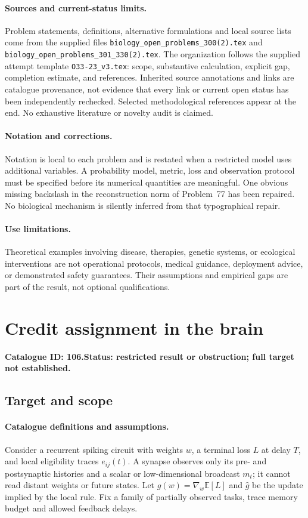 \documentclass[11pt]{article}
\newcommand{\E}{\mathbb E}
\providecommand{\E}{\mathbb E}
\begin{document}
\paragraph{Sources and current-status limits.}
Problem statements, definitions, alternative formulations and local source lists
come from the supplied files
\texttt{biology\_open\_problems\_300(2).tex} and
\texttt{biology\_open\_problems\_301\_330(2).tex}.
The organization follows the supplied attempt template
\texttt{O33-23\_v3.tex}: scope, substantive calculation, explicit gap,
completion estimate, and references. Inherited source annotations and links are
catalogue provenance, not evidence that every link or current open status has
been independently rechecked. Selected methodological references appear at the
end. No exhaustive literature or novelty audit is claimed.

\paragraph{Notation and corrections.}
Notation is local to each problem and is restated when a restricted model uses
additional variables. A probability model, metric, loss and observation protocol
must be specified before its numerical quantities are meaningful. One obvious
missing backslash in the reconstruction norm of Problem~77 has been repaired.
No biological mechanism is silently inferred from that typographical repair.

\paragraph{Use limitations.}
Theoretical examples involving disease, therapies, genetic systems, or ecological
interventions are not operational protocols, medical guidance, deployment advice,
or demonstrated safety guarantees. Their assumptions and empirical gaps are part
of the result, not optional qualifications.

\setcounter{section}{105}
\section{Credit assignment in the brain}
\label{prob:106}
\noindent\textbf{Catalogue ID: 106.}\quad \textbf{Status: restricted result or obstruction; full target not established.}
\subsection{Target and scope}
\paragraph{Catalogue definitions and assumptions.}
Consider a recurrent spiking circuit with weights $w$, a terminal loss $L$ at delay $T$, and local eligibility traces $e_{ij}(t)$. A synapse observes only its pre- and postsynaptic histories and a scalar or low-dimensional broadcast $m_t$; it cannot read distant weights or future states. Let $g(w)=\nabla_w\E[L]$ and $\widehat g$ be the update implied by the local rule. Fix a family of partially observed tasks, trace memory budget and allowed feedback delays.
\end{document}
